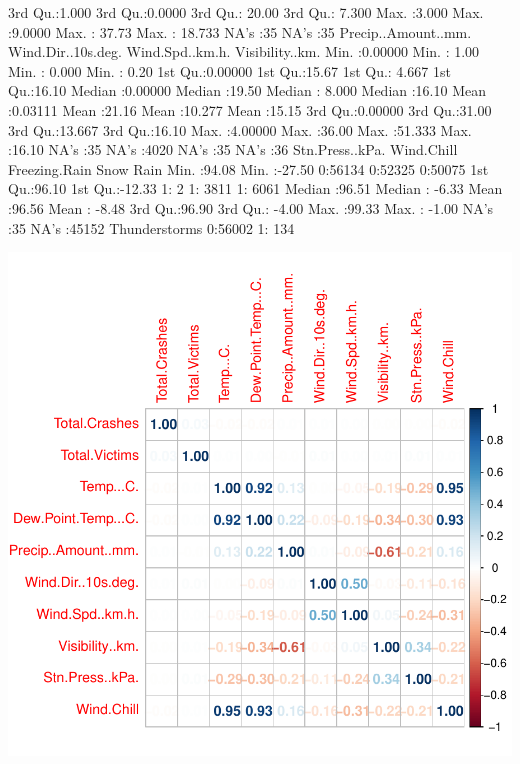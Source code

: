 \documentclass[11pt, a4paper]{article}
\begin{document}
\begin{Schunk}
\begin{Soutput}
 3rd Qu.:1.000   3rd Qu.:0.0000   3rd Qu.: 20.00   3rd Qu.:  7.300    
 Max.   :3.000   Max.   :9.0000   Max.   : 37.73   Max.   : 18.733    
                                  NA's   :35       NA's   :35         
 Precip..Amount..mm. Wind.Dir..10s.deg. Wind.Spd..km.h.  Visibility..km.
 Min.   :0.00000     Min.   : 1.00      Min.   : 0.000   Min.   : 0.20  
 1st Qu.:0.00000     1st Qu.:15.67      1st Qu.: 4.667   1st Qu.:16.10  
 Median :0.00000     Median :19.50      Median : 8.000   Median :16.10  
 Mean   :0.03111     Mean   :21.16      Mean   :10.277   Mean   :15.15  
 3rd Qu.:0.00000     3rd Qu.:31.00      3rd Qu.:13.667   3rd Qu.:16.10  
 Max.   :4.00000     Max.   :36.00      Max.   :51.333   Max.   :16.10  
 NA's   :35          NA's   :4020       NA's   :35       NA's   :36     
 Stn.Press..kPa.   Wind.Chill     Freezing.Rain Snow      Rain     
 Min.   :94.08   Min.   :-27.50   0:56134       0:52325   0:50075  
 1st Qu.:96.10   1st Qu.:-12.33   1:    2       1: 3811   1: 6061  
 Median :96.51   Median : -6.33                                    
 Mean   :96.56   Mean   : -8.48                                    
 3rd Qu.:96.90   3rd Qu.: -4.00                                    
 Max.   :99.33   Max.   : -1.00                                    
 NA's   :35      NA's   :45152                                     
 Thunderstorms
 0:56002      
 1:  134      
\end{Soutput}
\end{Schunk}
\includegraphics{variableinvestigation-ss}
\end{document}
